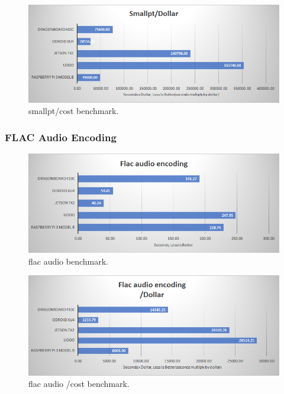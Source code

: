 \documentclass[english]{book_template} %
\begin{document}
\begin{figure}[H]
\center
\caption{smallpt/cost benchmark.\label{fig:smallpt_cost}}
\includegraphics[scale=1]{./resultphoronix/smallpt_cost.png}
\end{figure}

\subsubsection{FLAC Audio Encoding}

\begin{figure}[H]
\center
\caption{flac audio benchmark.\label{fig:flacAduio}}
\includegraphics[scale=1]{./resultphoronix/flacAudio.png}
\end{figure}

\begin{figure}[H]
\center
\caption{flac audio /cost benchmark.\label{fig:FlacAudioCost}}
\includegraphics[scale=1]{./resultphoronix/flacAudio_cost.png}
\end{figure}
\end{document}

